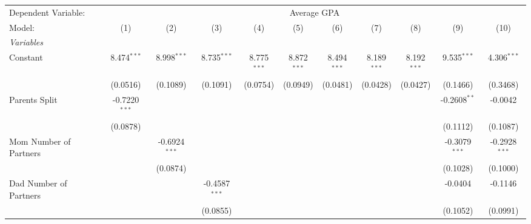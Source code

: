 
\begingroup
\centering
\begin{tabular}{lcccccccccc}
   \tabularnewline \midrule \midrule
   Dependent Variable: & \multicolumn{10}{c}{Average GPA}\\
   Model:                                    & (1)             & (2)             & (3)             & (4)             & (5)             & (6)             & (7)           & (8)                    & (9)             & (10)\\  
   \midrule
   \emph{Variables}\\
   Constant                                  & 8.474$^{***}$   & 8.998$^{***}$   & 8.735$^{***}$   & 8.775$^{***}$   & 8.872$^{***}$   & 8.494$^{***}$   & 8.189$^{***}$ & 8.192$^{***}$          & 9.535$^{***}$   & 4.306$^{***}$\\   
                                             & (0.0516)        & (0.1089)        & (0.1091)        & (0.0754)        & (0.0949)        & (0.0481)        & (0.0428)      & (0.0427)               & (0.1466)        & (0.3468)\\   
   Parents Split                             & -0.7220$^{***}$ &                 &                 &                 &                 &                 &               &                        & -0.2608$^{**}$  & -0.0042\\   
                                             & (0.0878)        &                 &                 &                 &                 &                 &               &                        & (0.1112)        & (0.1087)\\   
   Mom Number of Partners                    &                 & -0.6924$^{***}$ &                 &                 &                 &                 &               &                        & -0.3079$^{***}$ & -0.2928$^{***}$\\   
                                             &                 & (0.0874)        &                 &                 &                 &                 &               &                        & (0.1028)        & (0.1000)\\   
   Dad Number of Partners                    &                 &                 & -0.4587$^{***}$ &                 &                 &                 &               &                        & -0.0404         & -0.1146\\   
                                             &                 &                 & (0.0855)        &                 &                 &                 &               &                        & (0.1052)        & (0.0991)\\   

\end{tabular}
